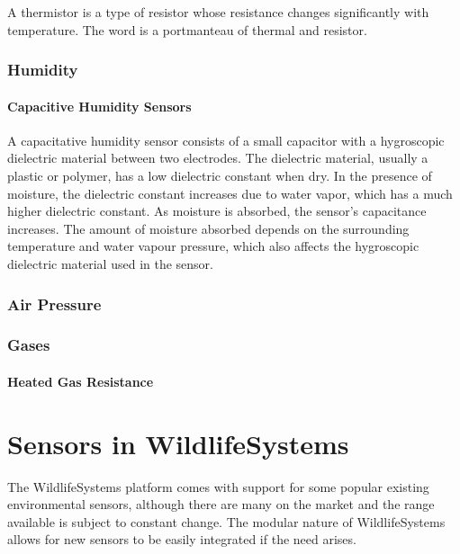 \documentclass[
]{book}
\begin{document}
A thermistor is a type of resistor whose resistance changes significantly with temperature. The word is a portmanteau of thermal and resistor.

\subsection{Humidity}\label{humidity}

\subsubsection{Capacitive Humidity Sensors}\label{capacitive-humidity-sensors}

A capacitative humidity sensor consists of a small capacitor with a hygroscopic dielectric material between two electrodes. The dielectric material, usually a plastic or polymer, has a low dielectric constant when dry. In the presence of moisture, the dielectric constant increases due to water vapor, which has a much higher dielectric constant. As moisture is absorbed, the sensor's capacitance increases. The amount of moisture absorbed depends on the surrounding temperature and water vapour pressure, which also affects the hygroscopic dielectric material used in the sensor.

\subsection{Air Pressure}\label{air-pressure}

\subsection{Gases}\label{gases}

\subsubsection{Heated Gas Resistance}\label{heated-gas-resistance}

\chapter{Sensors in WildlifeSystems}\label{sensors-in-wildlifesystems}

The WildlifeSystems platform comes with support for some popular existing environmental sensors, although there are many on the market and the range available is subject to constant change. The modular nature of WildlifeSystems allows for new sensors to be easily integrated if the need arises.
\end{document}
